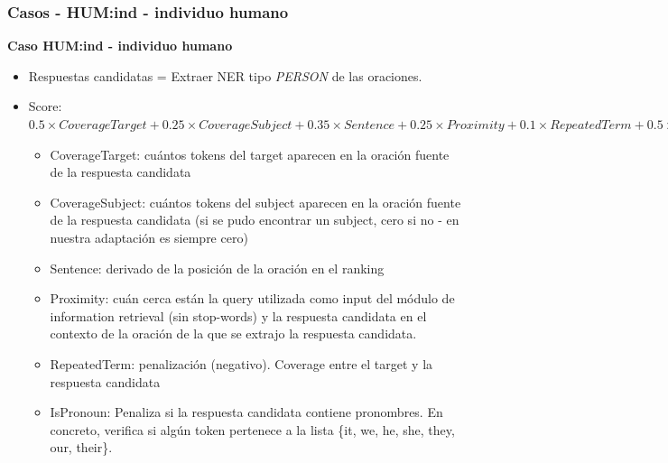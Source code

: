 \begin{frame}
  \frametitle{Casos - HUM:ind - individuo humano}
  \textbf{Caso HUM:ind - individuo humano}
  \begin{itemize}
    \item Respuestas candidatas = Extraer NER tipo \textit{PERSON} de las oraciones.
    \item Score: $0.5 \times CoverageTarget+ 0.25 \times CoverageSubject + 0.35 \times Sentence +
               0.25 \times Proximity  + 0.1 \times RepeatedTerm + 0.5 \times IsPronoun$
    \begin{itemize}
      \item \tiny{CoverageTarget: cuántos tokens del target aparecen en la oración fuente de la respuesta candidata}
      \item \tiny{CoverageSubject: cuántos tokens del subject aparecen en la oración fuente de la respuesta candidata (si se pudo encontrar un subject, cero si no - en nuestra adaptación es siempre cero)}
      \item \tiny{Sentence: derivado de la posición de la oración en el ranking}
      \item \tiny{Proximity: cuán cerca están la query utilizada como input del módulo de information retrieval (sin stop-words) y la respuesta candidata en el contexto de la oración de la que se extrajo la respuesta candidata.}
      \item \tiny{RepeatedTerm: penalización (negativo). Coverage entre el target y la respuesta candidata}
      \item \tiny{IsPronoun: Penaliza si la respuesta candidata contiene pronombres. En concreto, verifica si algún token pertenece a la lista \{it, we, he, she, they, our, their\}.}
    \end{itemize}
  \end{itemize}

\end{frame}


